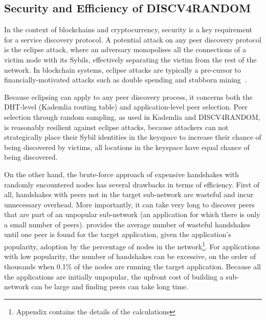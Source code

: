 \subsection{Security and Efficiency of DISCV4RANDOM}
\label{sec:securityEfficiency}

In the context of blockchains and cryptocurrency, security is a key requirement for a service discovery protocol. A potential attack on any peer discovery protocol is the eclipse attack, where an adversary monopolises all the connections of a victim node with its Sybils, effectively separating the victim from the rest of the network. In blockchain systems, eclipse attacks are typically a pre-cursor to financially-motivated attacks such as double spending and stubborn mining~\cite{henningsen2019eclipsing}.

Because eclipsing can apply to any peer discovery process, it concerns both the DHT-level (\ie Kademlia routing table) and application-level peer selection. Peer selection through random sampling, as used in Kademlia and DISCV4RANDOM, is reasonably resilient against eclipse attacks, because attackers can not strategically place their Sybil identities in the keyspace to increase their chance of being discovered by victims, \ie all locations in the keyspace have equal chance of being discovered.



On the other hand, the brute-force approach of expensive handshakes with randomly encountered nodes has several drawbacks in terms of efficiency. First of all, handshakes with peers not in the target sub-network are wasteful and incur unnecessary overhead. More importantly, it can take very long to discover peers that are part of an unpopular sub-network (\ie an application for which there is only a small number of peers).  provides the average number of wasteful handshakes until one peer is found for the target application, given the application's popularity, \ie adoption by the percentage of nodes in the network\footnote{Appendix contains the details of the calculations}. For applications with low popularity, the number of handshakes can be excessive, \ie on the order of thousands when 0.1\% of the nodes are running the target application. Because all the applications are initially unpopular, the upfront cost of building a sub-network can be large and finding peers can take long time.

